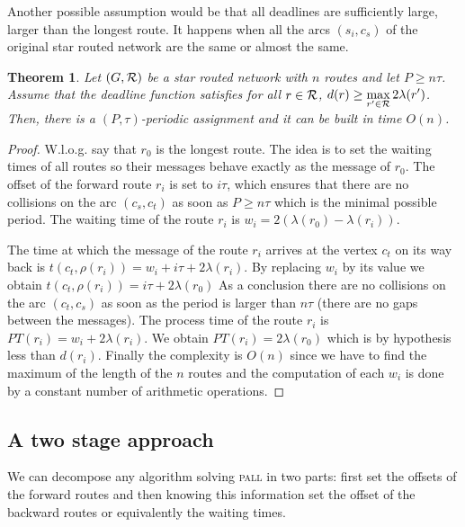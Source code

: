 \documentclass[a4paper,10pt]{article}
\newtheorem{theorem}{Theorem}
\newcommand\pall{\textsc{pall}\xspace}
\begin{document}
	Another possible assumption would be that all deadlines are sufficiently large, larger than the longest route.
	It happens when all the arcs $(s_i,c_s)$ of the original star routed network are the same or almost the same.
		
	 \begin{theorem}\label{th:asym}
	 Let $(G,{\cal R})$ be a star routed network with $n$ routes and let $P \geq n\tau$. Assume that the deadline function 
	 satisfies for all $r\in {\cal R}$, $d(r) \geq \displaystyle{\max_{r' \in  {\cal R}} 2\lambda(r')}$. Then, there is a $(P,\tau)$-periodic assignment and it can be built in time $O(n)$.
	 \end{theorem}
      \begin{proof}
      W.l.o.g. say that $r_0$ is the longest route. The idea is to set the waiting times of all routes so their messages behave exactly as the message of $r_0$.        
        The offset of the forward route $r_i$ is set to $i\tau$, which ensures that there are no collisions on the arc $(c_s,c_t)$ as soon as $P \geq n\tau$ which is the minimal possible period. The waiting time of the route $r_i$ is $w_i = 2(\lambda(r_{0}) - \lambda(r_{i}))$.
        
        The time at which the message of the route $r_i$ arrives at the vertex $c_t$ on its way back is $t(c_t,\rho(r_i)) = w_i + i\tau + 2\lambda(r_{i})$. By replacing $w_i$ by its value we obtain $t(c_t,\rho(r_i)) =  i\tau + 2\lambda(r_{0})$
        As a conclusion there are no collisions on the arc $(c_t,c_s)$ as soon as the period is larger than $n\tau$ (there are no gaps between the messages). The process time of the route $r_i$ is $PT(r_i) = w_i + 2\lambda(r_{i}) $. We obtain $PT(r_i) = 2\lambda(r_{0})$ which is by hypothesis less than $d(r_i)$.
	Finally the complexity is $O(n)$ since we have to find the maximum of the length of the $n$ routes and the computation of each $w_i$ is done by a constant number of arithmetic operations.
     \end{proof}
     
    
     \subsection{A two stage approach}
     
     We can decompose any algorithm solving \pall in two parts: first set the offsets of the forward routes and then knowing this information set the offset of the backward routes or equivalently the waiting times.   
     
\end{document}
